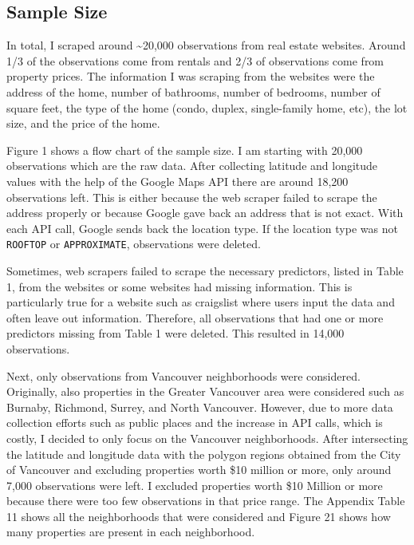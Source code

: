 \documentclass[
]{article}
\begin{document}
\hypertarget{sample-size}{%
\subsection{Sample Size}\label{sample-size}}

In total, I scraped around \textasciitilde20,000 observations from real
estate websites. Around 1/3 of the observations come from rentals and
2/3 of observations come from property prices. The information I was
scraping from the websites were the address of the home, number of
bathrooms, number of bedrooms, number of square feet, the type of the
home (condo, duplex, single-family home, etc), the lot size, and the
price of the home.

Figure 1 shows a flow chart of the sample size. I am starting with
20,000 observations which are the raw data. After collecting latitude
and longitude values with the help of the Google Maps API there are
around 18,200 observations left. This is either because the web scraper
failed to scrape the address properly or because Google gave back an
address that is not exact. With each API call, Google sends back the
location type. If the location type was not \texttt{ROOFTOP} or
\texttt{APPROXIMATE}, observations were deleted.

Sometimes, web scrapers failed to scrape the necessary predictors,
listed in Table 1, from the websites or some websites had missing
information. This is particularly true for a website such as craigslist
where users input the data and often leave out information. Therefore,
all observations that had one or more predictors missing from Table 1
were deleted. This resulted in 14,000 observations.

Next, only observations from Vancouver neighborhoods were considered.
Originally, also properties in the Greater Vancouver area were
considered such as Burnaby, Richmond, Surrey, and North Vancouver.
However, due to more data collection efforts such as public places and
the increase in API calls, which is costly, I decided to only focus on
the Vancouver neighborhoods. After intersecting the latitude and
longitude data with the polygon regions obtained from the City of
Vancouver and excluding properties worth \$10 million or more, only
around 7,000 observations were left. I excluded properties worth \$10
Million or more because there were too few observations in that price
range. The Appendix Table 11 shows all the neighborhoods that were
considered and Figure 21 shows how many properties are present in each
neighborhood.
\end{document}

